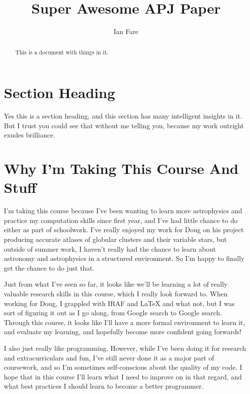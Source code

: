 \documentclass[iop,apj,tighten]{emulateapj}
\begin{document}
\title{Super Awesome APJ Paper}
\author{Ian Fare}

\begin{abstract}
This is a document with things in it.
\end{abstract}

\maketitle

\section{Section Heading}
Yes this is a section heading, and this section has many intelligent insights in it. But I trust you could see that without me telling you, because my work outright exudes brilliance.

\section{Why I'm Taking This Course And Stuff}
I'm taking this course because I've been wanting to learn more astrophysics and practice my computation skills since first year, and I've had little chance to do either as part of schoolwork. I've really enjoyed my work for Doug on his project producing accurate atlases of globular clusters and their variable stars, but outside of summer work, I haven't really had the chance to learn about astronomy and astrophysics in a structured environment. So I'm happy to finally get the chance to do just that.

Just from what I've seen so far, it looks like we'll be learning a lot of really valuable research skills in this course, which I really look forward to. When working for Doug, I grappled with IRAF and LaTeX and what not, but I was sort of figuring it out as I go along, from Google search to Google search. Through this course, it looks like I'll have a more formal environment to learn it, and evaluate my learning, and hopefully become more confident going forwards!

I also just really like programming. However, while I've been doing it for research and extracurriculars and fun, I've still never done it as a major part of coursework, and so I'm sometimes self-conscious about the quality of my code. I hope that in this course I'll learn what I need to improve on in that regard, and what best practices I should learn to become a better programmer.
\end{document}
